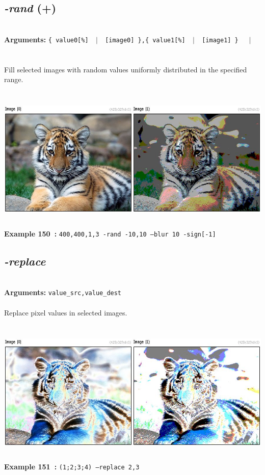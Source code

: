 \documentclass[a4paper,11pt,twoside]{book}
\begin{document}
\subsection{\emph{-rand} (+)}\vspace*{-0.5em}
~\\\textbf{Arguments: } 
{\small \texttt{\{ value0[\%] ~$|$~ [image0] \},\{ value1[\%] ~$|$~ [image1] \}}}~~~$|$\\
\hspace*{2.2cm}{\small \texttt{[image]}}\\~\\
Fill selected images with random values uniformly distributed in the specified range.
\begin{center}\includegraphics[keepaspectratio=true,height=7cm,width=\textwidth]{img/gmic_def150.jpg}\\
{\footnotesize \textbf{Example 150~:} \texttt{400,400,1,3 -rand -10,10 --blur 10 -sign[-1]}}
\end{center}

\subsection{\emph{-replace} }\vspace*{-0.5em}
~\\\textbf{Arguments: } 
{\small \texttt{value\_src,value\_dest}}\\~\\
Replace pixel values in selected images.
\begin{center}\includegraphics[keepaspectratio=true,height=7cm,width=\textwidth]{img/gmic_def151.jpg}\\
{\footnotesize \textbf{Example 151~:} \texttt{(1;2;3;4) --replace 2,3}}
\end{center}
\end{document}
